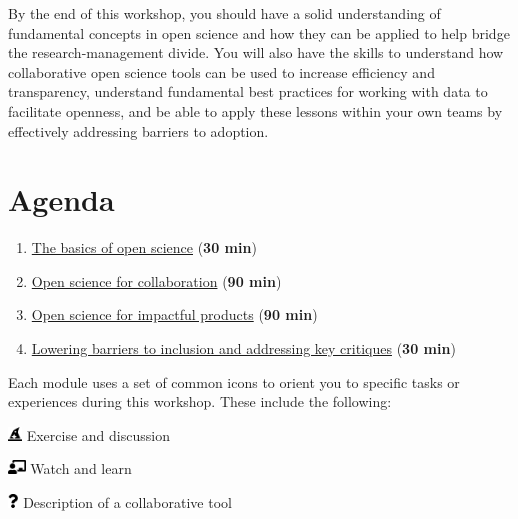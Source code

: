\documentclass[
  letterpaper,
  DIV=11,
  numbers=noendperiod]{scrreprt}
\providecommand{\tightlist}{%
  \setlength{\itemsep}{0pt}\setlength{\parskip}{0pt}}\usepackage{longtable,booktabs,array}
\begin{document}
By the end of this workshop, you should have a solid understanding of
fundamental concepts in open science and how they can be applied to help
bridge the research-management divide. You will also have the skills to
understand how collaborative open science tools can be used to increase
efficiency and transparency, understand fundamental best practices for
working with data to facilitate openness, and be able to apply these
lessons within your own teams by effectively addressing barriers to
adoption.

\hypertarget{agenda}{%
\section*{Agenda}\label{agenda}}

\begin{enumerate}
\def\labelenumi{\arabic{enumi}.}
\tightlist
\item
  \protect\hyperlink{basics}{The basics of open science} (\textbf{30
  min})
\item
  \protect\hyperlink{collaborate}{Open science for collaboration}
  (\textbf{90 min})
\item
  \protect\hyperlink{impact}{Open science for impactful products}
  (\textbf{90 min})
\item
  \protect\hyperlink{implement}{Lowering barriers to inclusion and
  addressing key critiques} (\textbf{30 min})
\end{enumerate}

Each module uses a set of common icons to orient you to specific tasks
or experiences during this workshop. These include the following:

\includegraphics[width=1em,height=1em]{./index_files/figure-pdf/fa-icon-20d474448f872ee43905e611a2502347.pdf}
Exercise and discussion

\includegraphics[width=1.25em,height=1em]{./index_files/figure-pdf/fa-icon-5a0e5cd7bfbf585f8546c1ff4cebae73.pdf}
Watch and learn

\includegraphics[width=0.75em,height=1em]{./index_files/figure-pdf/fa-icon-8447cf12acba1bc263badfefa79f6dd7.pdf}
Description of a collaborative tool
\end{document}
